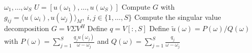 \begin{algorithmic}
    \Require $\omega_1, \dots, \omega_S$
    \Require $U = [u(\omega_1), \dots, u(\omega_S)]$ 
    \State Compute $G$ with $g_{ij} = \langle u(\omega_i), u(\omega_j)\rangle_M,~ i, j \in \{1, \dots, S \}$ 
    \State Compute the singular value decomposition $G = V \Sigma V^H$
    \State Define $q = V[:, S]$
    \State Define $\tilde{u}(\omega) = P(\omega) / Q(\omega)$ with $P(\omega) = \sum_{j=1}^S \frac{q_j u(\omega_j)}{\omega - \omega_j}$ and $Q(\omega) = \sum_{j=1}^S \frac{q_j}{\omega - \omega_j}$
\end{algorithmic}